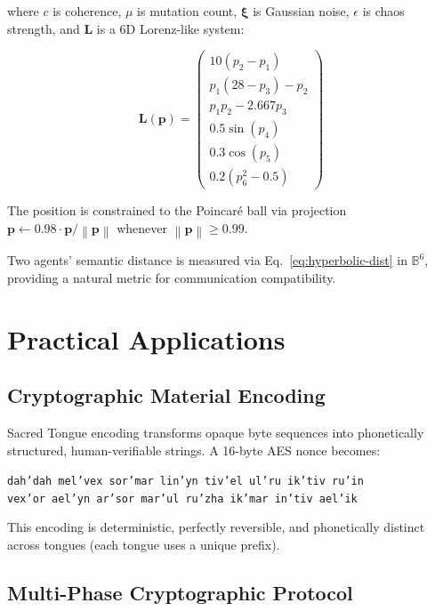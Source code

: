 \documentclass[11pt,a4paper]{article}
\newcommand{\BB}{\mathbb{B}}
\newcommand{\norm}[1]{\left\|#1\right\|}
\begin{document}
where $c$ is coherence, $\mu$ is mutation count, $\boldsymbol{\xi}$ is
Gaussian noise, $\epsilon$ is chaos strength, and $\mathbf{L}$ is a
6D Lorenz-like system:

\begin{equation}
  \mathbf{L}(\mathbf{p}) = \begin{pmatrix}
    10(p_2 - p_1) \\
    p_1(28 - p_3) - p_2 \\
    p_1 p_2 - 2.667 p_3 \\
    0.5 \sin(p_4) \\
    0.3 \cos(p_5) \\
    0.2(p_6^2 - 0.5)
  \end{pmatrix}
\end{equation}

The position is constrained to the Poincar\'{e} ball via projection
$\mathbf{p} \gets 0.98 \cdot \mathbf{p}/\norm{\mathbf{p}}$ whenever
$\norm{\mathbf{p}} \geq 0.99$.

Two agents' semantic distance is measured via Eq.~\eqref{eq:hyperbolic-dist}
in $\BB^6$, providing a natural metric for communication compatibility.

\section{Practical Applications}
\label{sec:applications}

\subsection{Cryptographic Material Encoding}

Sacred Tongue encoding transforms opaque byte sequences into
phonetically structured, human-verifiable strings. A 16-byte AES nonce
becomes:

\begin{center}
\texttt{dah'dah mel'vex sor'mar lin'yn tiv'el ul'ru ik'tiv ru'in \\
vex'or ael'yn ar'sor mar'ul ru'zha ik'mar in'tiv ael'ik}
\end{center}

This encoding is deterministic, perfectly reversible, and phonetically
distinct across tongues (each tongue uses a unique prefix).

\subsection{Multi-Phase Cryptographic Protocol}
\end{document}
